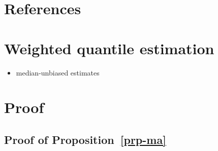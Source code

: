 \documentclass[
  11pt,
  a4paper,
]{article}
\providecommand{\tightlist}{%
  \setlength{\itemsep}{0pt}\setlength{\parskip}{0pt}}\usepackage{longtable,booktabs,array}
\theoremstyle{plain}
\theoremstyle{plain}
\theoremstyle{remark}
\begin{document}
\section*{References}\label{references}

\printbibliography[heading=none]

\newpage
\appendix
\setcounter{section}{0}
\renewcommand{\thesection}{Appendix \Alph{section}}
\renewcommand{\thesubsection}{\Alph{section}.\arabic{subsection}}
\renewcommand{\thefigure}{A\arabic{figure}}
\renewcommand{\thetable}{A\arabic{table}}
\setcounter{figure}{0}
\setcounter{table}{0}

\section{Weighted quantile estimation}\label{sec-wq}

\begin{itemize}
\tightlist
\item
  median-unbiased estimates
\end{itemize}

\section{Proof}\label{sec-proof}

\subsection{\texorpdfstring{Proof of
Proposition~\ref{prp-ma}}{Proof of Proposition~}}\label{sec-proof_ma}
\end{document}
